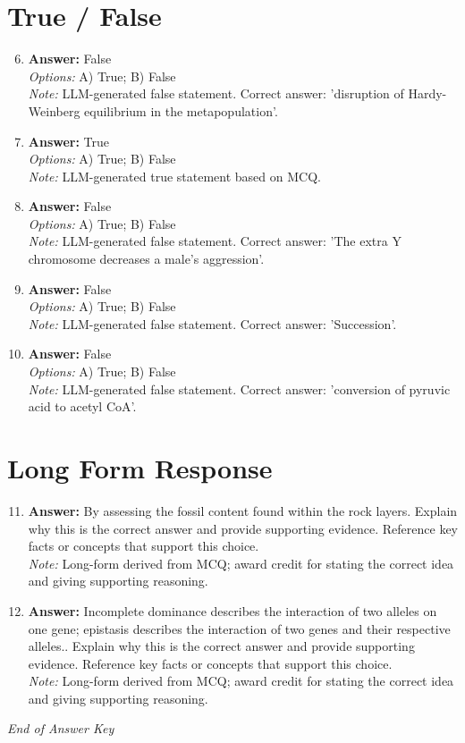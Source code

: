 \documentclass[12pt]{article}
\begin{document}
\section*{True / False}
\begin{enumerate}[label=\arabic*.]
\setcounter{enumi}{5}
\item \textbf{Answer:} False
\\ \textit{Options:} A) True; B) False
\\ \textit{Note:} LLM-generated false statement. Correct answer: 'disruption of Hardy-Weinberg equilibrium in the metapopulation'.
\item \textbf{Answer:} True
\\ \textit{Options:} A) True; B) False
\\ \textit{Note:} LLM-generated true statement based on MCQ.
\item \textbf{Answer:} False
\\ \textit{Options:} A) True; B) False
\\ \textit{Note:} LLM-generated false statement. Correct answer: 'The extra Y chromosome decreases a male's aggression'.
\item \textbf{Answer:} False
\\ \textit{Options:} A) True; B) False
\\ \textit{Note:} LLM-generated false statement. Correct answer: 'Succession'.
\item \textbf{Answer:} False
\\ \textit{Options:} A) True; B) False
\\ \textit{Note:} LLM-generated false statement. Correct answer: 'conversion of pyruvic acid to acetyl CoA'.
\end{enumerate}

\section*{Long Form Response}
\begin{enumerate}[label=\arabic*.]
\setcounter{enumi}{10}
\item \textbf{Answer:} By assessing the fossil content found within the rock layers. Explain why this is the correct answer and provide supporting evidence. Reference key facts or concepts that support this choice.
\\ \textit{Note:} Long-form derived from MCQ; award credit for stating the correct idea and giving supporting reasoning.
\item \textbf{Answer:} Incomplete dominance describes the interaction of two alleles on one gene; epistasis describes the interaction of two genes and their respective alleles.. Explain why this is the correct answer and provide supporting evidence. Reference key facts or concepts that support this choice.
\\ \textit{Note:} Long-form derived from MCQ; award credit for stating the correct idea and giving supporting reasoning.
\end{enumerate}

\vfill
\noindent\textit{End of Answer Key}
\end{document}

